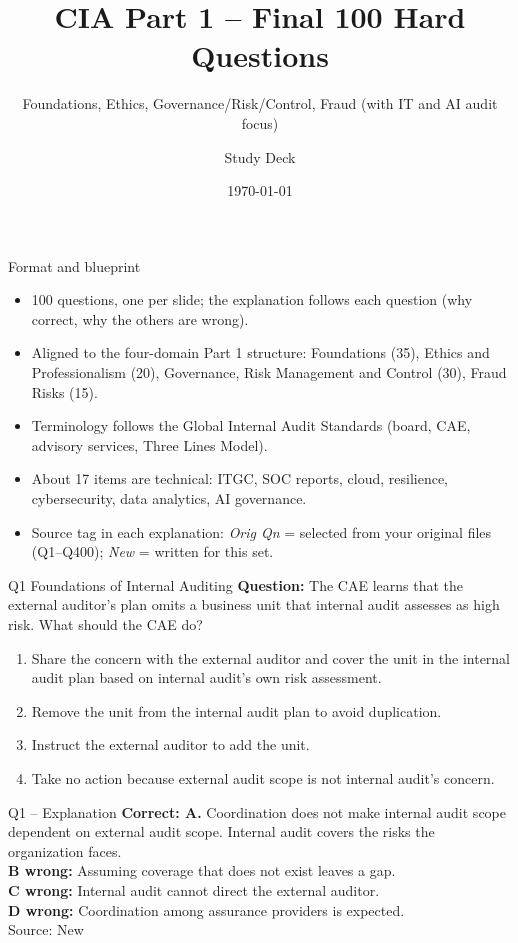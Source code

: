 \documentclass[aspectratio=169,10pt]{beamer}
\title{CIA Part 1 -- Final 100 Hard Questions}
\subtitle{Foundations, Ethics, Governance/Risk/Control, Fraud (with IT and AI audit focus)}
\author{Study Deck}
\date{\today}
\begin{document}
\begin{frame}\titlepage\end{frame}
\begin{frame}{Format and blueprint}
\small
\begin{itemize}
\item 100 questions, one per slide; the explanation follows each question (why correct, why the others are wrong).
\item Aligned to the four-domain Part 1 structure: Foundations (35), Ethics and Professionalism (20), Governance, Risk Management and Control (30), Fraud Risks (15).
\item Terminology follows the Global Internal Audit Standards (board, CAE, advisory services, Three Lines Model).
\item About 17 items are technical: ITGC, SOC reports, cloud, resilience, cybersecurity, data analytics, AI governance.
\item Source tag in each explanation: \textit{Orig Qn} = selected from your original files (Q1--Q400); \textit{New} = written for this set.
\end{itemize}
\end{frame}

\begin{frame}[t]{Q1 \hfill {\scriptsize Foundations of Internal Auditing}}
	\small
	\textbf{Question:} The CAE learns that the external auditor's plan omits a business unit that internal audit assesses as high risk. What should the CAE do?
	\begin{enumerate}[label=\Alph*.,itemsep=1pt,topsep=3pt]
			\item Share the concern with the external auditor and cover the unit in the internal audit plan based on internal audit's own risk assessment.
			\item Remove the unit from the internal audit plan to avoid duplication.
			\item Instruct the external auditor to add the unit.
			\item Take no action because external audit scope is not internal audit's concern.
	\end{enumerate}
\end{frame}

\begin{frame}[t]{Q1 -- Explanation}
	\footnotesize
	\textbf{Correct: A.} Coordination does not make internal audit scope dependent on external audit scope. Internal audit covers the risks the organization faces. \\[5pt]
\textbf{B wrong:} Assuming coverage that does not exist leaves a gap. \\[3pt]
\textbf{C wrong:} Internal audit cannot direct the external auditor. \\[3pt]
\textbf{D wrong:} Coordination among assurance providers is expected. \\[3pt]
	\vfill {\tiny Source: New}
\end{frame}
\end{document}
